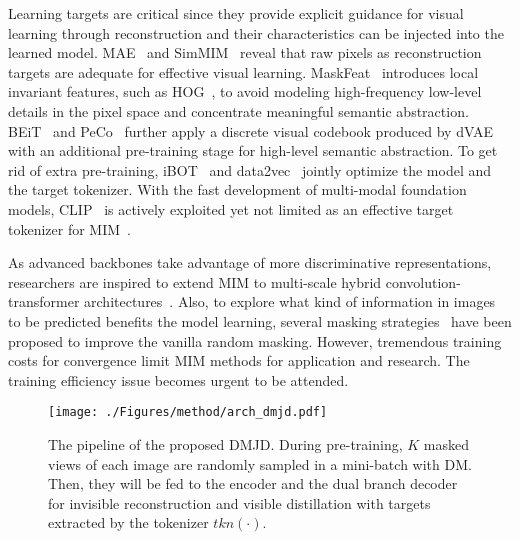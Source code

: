 \documentclass[lettersize,journal]{IEEEtran}
\begin{document}
Learning targets are critical since they provide explicit guidance for visual learning through reconstruction 
and their characteristics can be injected into the learned model. 
MAE~\cite{2021arXiv211106377H} and SimMIM~\cite{2021arXiv211109886X} reveal that raw pixels as reconstruction targets are adequate for effective visual learning. MaskFeat~\cite{2021arXiv211209133W} introduces local invariant features, such as HOG~\cite{Dalal2005HistogramsOO}, to avoid modeling high-frequency low-level details in the pixel space and concentrate meaningful semantic abstraction.
BEiT~\cite{2021arXiv210608254B} and PeCo~\cite{2021arXiv211112710D} further apply a discrete visual codebook produced by dVAE~\cite{2021arXiv210212092R} with an additional pre-training stage for high-level semantic abstraction. 
To get rid of extra pre-training, iBOT~\cite{2021arXiv211107832Z} and data2vec~\cite{Baevski2022data2vecAG} jointly optimize the model and the target tokenizer.
With the fast development of multi-modal foundation models, CLIP~\cite{Radford2021LearningTV} is actively exploited yet not limited as an effective target tokenizer for MIM~\cite{2022arXiv220305175W, 2022arXiv220806366P, 2022arXiv220810442W, 2022arXiv220806049H, 2022arXiv221109799Z}.

As advanced backbones take advantage of more discriminative representations, researchers are inspired to extend MIM to multi-scale hybrid convolution-transformer architectures~\cite{2021arXiv211109886X, 2022arXiv220503892G}.
Also, to explore what kind of information in images to be predicted benefits the model learning, several masking strategies~\cite{Li2021MSTMS, 2022arXiv220113100S, 2022arXiv220312719K, 2022arXiv220610207L} have been proposed to improve the vanilla random masking.
However, tremendous training costs for convergence limit MIM methods for application and research. The training efficiency issue becomes urgent to be attended.

\begin{figure*}[t]
  \centering
  \texttt{[image: ./Figures/method/arch\_dmjd.pdf]}
  \caption{The pipeline of the proposed DMJD. During pre-training, $K$ masked views of each image are randomly sampled in a mini-batch with DM. Then, they will be fed to the encoder and the dual branch decoder for invisible reconstruction and visible distillation with targets extracted by the tokenizer $tkn(\cdot)$.}
  \label{fig:arch}
\end{figure*}
\end{document}
